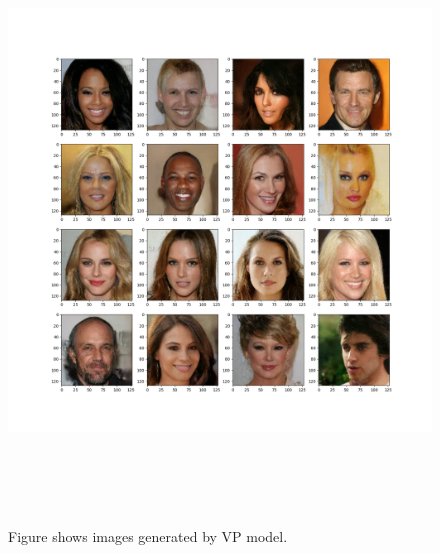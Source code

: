 \documentclass[10pt]{article}
\begin{document}
\begin{figure}[H]
\hspace*{-2cm}  
    \includegraphics[width=16cm, height = 16cm]{sde_model_1000.png}
    \caption{Figure shows images generated by VP model.}
\label{fig:vp_example}
\end{figure}
\end{document}
